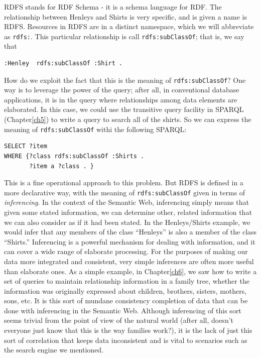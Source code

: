 RDFS stands for RDF Schema - it is a schema language for RDF.  The relationship 
between Henleys and Shirts is very specific, and is given a name is RDFS.  Resources in 
RDFS are in a distinct namespace, which we will abbreviate as \texttt{rdfs:}. 
This particular relationship is call \texttt{rdfs:subClassOf}; that is, we
say that

\begin{lstlisting}
:Henley  rdfs:subClassOf :Shirt . 
\end{lstlisting}


How do we exploit the fact that this is the meaning of \texttt{rdfs:subClassOf}? 
One way is to leverage the power of the query;
after all, in conventional database applications, it is in the query
where relationships among data elements are elaborated. In this case, we
could use the transitive query facility in SPARQL (Chapter\ref{ch5}) to write a
query to search all of the shirts.  So we can express the meaning of \texttt{rdfs:subClassOf} withi 
the following SPARQL:

\begin{lstlisting}
SELECT ?item
WHERE {?class rdfs:subClassOf :Shirts .
       ?item a ?class . }
\end{lstlisting}

This is a fine operational approach to this problem. But RDFS is defined 
in a more declarative way, with the meaning of \texttt{rdfs:subClassOf} given 
in terms of
\emph{inferencing}. In the context of the Semantic Web, inferencing
simply means that given some stated information, we can determine other,
related information that we can also consider as if it had been stated.
In the Henleys/Shirts example, we would infer that any members of the
class ``Henleys'' is also a member of the class ``Shirts.'' Inferencing
is a powerful mechanism for dealing with information, and it can cover a
wide range of elaborate processing. For the purposes of making our data
more integrated and consistent, very simple inferences are often more
useful than elaborate ones. As a simple example, in Chapter\ref{ch6}, we saw
how to write a set of queries to maintain relationship information in a
family tree, whether the information was originally expressed about
children, brothers, sisters, mothers, sons, etc. It is this sort of
mundane consistency completion of data that can be done with inferencing
in the Semantic Web. Although inferencing of this sort seems trivial
from the point of view of the natural world (after all, doesn't everyone
just know that this is the way families work?), it is the lack of just
this sort of correlation that keeps data inconsistent and is vital to
scenarios such as the search engine we mentioned.


